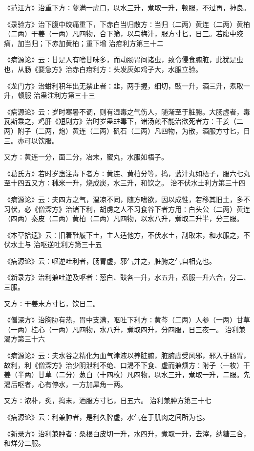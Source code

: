 \documentclass[a4paper,12pt,UTF8,twoside]{ctexbook}
\begin{document}
《范汪方》治重下方∶蓼满一虎口，以水三升，煮取一升，顿服，不过再，神良。

《录验方》治下腹中绞痛重下，下赤白当归散方∶当归（二两）黄连（二两）黄柏（二两）干姜（一两）凡四物，合下筛，以乌梅汁，服方寸匕，日三。若腹中绞痛，加当归；下赤加黄柏；重下增
治疳利方第三十二

《病源论》云∶甘是人有嗜甘味多，而动肠胃间诸虫，致令侵食腑脏，此犹是虫也，从肠《要急方》治赤白疳利方∶头发灰如鸡子大，水服立验。

《龙门方》治蚶利积年出无禁止者∶韭，两手握，细切，豉一升，酒三升，煮取一升，顿服
治蛊注利方第三十三

《病源论》云∶岁时寒暑不调，则有湿毒之气伤人，随渐至于脏腑。大肠虚者，毒瓦斯乘之，鸡肝《短剧方》治时岁蛊蛀毒下，诸汤煎不能治欲死者方∶干姜（二两）附子（二两，炮）黄连（二两）矾石（二两）凡四物，为散，酒服方寸匕，日三。亦可以饮服。

又方∶黄连一分，面二分，冶末，蜜丸，水服如梧子。

《葛氏方》若时岁蛊注毒下者方∶黄连、黄柏分等，捣，蓝汁丸如梧子，服六七丸至十四五又方∶秫米一升，烧成炭，水三升，和饮之。
治不伏水土利方第三十四

《病源论》云∶夫四方之气，温凉不同，随方嗜欲，因以成性，若移其旧土，多不习伏，必《僧深方》治诸下利，胡虏之人不习食谷下者方用∶白头公（二两）黄连（四两）秦皮（二两）黄柏（二两）凡四物，以水八升，煮取二升半，分三服。

《本草拾遗》云∶旧着鞋履下土，主人适他方，不伏水土，刮取末，和水服之，不伏水土与
治呕逆吐利方第三十五

《病源论》云∶呕逆吐利者，肠胃虚，邪气并之，脏腑之气自相克也。

《新录方》治利兼吐逆及呕者∶葱白、豉各一升，水五升，煮服一升六合，分二、三服。

又方∶干姜末方寸匕，饮日二。

《僧深方》治胸胁有热，胃中支满，呕吐下利方∶黄芩（二两）人参（一两）甘草（一两）桂心（一两）凡四物，水八升，煮取四升，分四服，日三夜一。
治利兼渴方第三十六

《病源论》云∶夫水谷之精化为血气津液以养脏腑，脏腑虚受风邪，邪入于肠胃，故利，利《僧深方》治少阴泄利不绝、口渴不下食、虚而兼烦方∶附子（一枚）干姜（半两）甘草（二分）葱白（十四枚）凡四物，以水三升，煮取一升，二服。先渴后呕者，心有停水，一方加犀角一两。

又方∶浓朴，炙，捣末，酒服方寸匕，日五六。
治利兼肿方第三十七

《病源论》云∶利兼肿者，是利久脾虚，水气在于肌肉之间所为也。

《新录方》治利兼肿者∶桑根白皮切一升，水四升，煮取一升，去滓，纳糖三合，和烊分二服。
\end{document}
